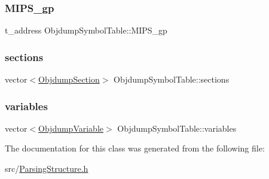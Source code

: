 \subsubsection{\texorpdfstring{M\+I\+P\+S\+\_\+gp}{MIPS\_gp}}
{\footnotesize\ttfamily t\+\_\+address Objdump\+Symbol\+Table\+::\+M\+I\+P\+S\+\_\+gp}

\mbox{\label{classObjdumpSymbolTable_a0a58d1a9bf16f9e3cf5cc14b16bbc5e0}} 
\subsubsection{\texorpdfstring{sections}{sections}}
{\footnotesize\ttfamily vector$<$\hyperlink{classObjdumpSection}{Objdump\+Section}$>$ Objdump\+Symbol\+Table\+::sections}

\mbox{\label{classObjdumpSymbolTable_adfc2a9a65eddc1af3f7e493ef9287cdb}} 
\subsubsection{\texorpdfstring{variables}{variables}}
{\footnotesize\ttfamily vector$<$\hyperlink{classObjdumpVariable}{Objdump\+Variable}$>$ Objdump\+Symbol\+Table\+::variables}



The documentation for this class was generated from the following file\+:\begin{DoxyCompactItemize}
\item 
src/\hyperlink{ParsingStructure_8h}{Parsing\+Structure.\+h}\end{DoxyCompactItemize}

